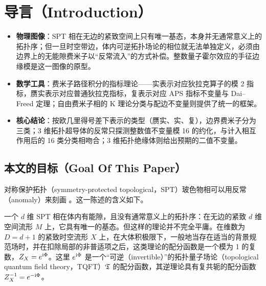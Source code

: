 
\section{导言（Introduction）}\label{intro}

\begin{keytakeaways}
\begin{itemize}[leftmargin=1.6em,itemsep=0.2em,topsep=0.2em]
  \item \textbf{物理图像}：SPT 相在无边的紧致空间上只有唯一基态，本身并无通常意义上的拓扑序；但一旦时空带边，体内可逆拓扑场论的相位就无法单独定义，必须由边界上的无能隙费米子以“反常流入”的方式补偿。整数量子霍尔效应的手征边缘模是这一图像的原型。
  \item \textbf{数学工具}：费米子路径积分的指标理论------实表示对应狄拉克算子的模 2 指标，赝实表示对应普通狄拉克指标，复表示对应 APS 指标不变量与 Dai--Freed 定理；自由费米子相的 K 理论分类与配边不变量则提供了统一的框架。
  \item \textbf{核心结论}：按欧几里得号差下表示的类型（赝实、实、复），边界费米子分为三类；3 维拓扑超导体的反常只探测整数值不变量模 16 的约化，与计入相互作用后的 16 类分类相吻合；3 维拓扑绝缘体则给出预期的二值不变量。
\end{itemize}
\end{keytakeaways}

\subsection{本文的目标（Goal Of This Paper）}\label{goal}

对称保护拓扑（symmetry-protected topological，SPT）玻色物相可以用反常（anomaly）来刻画 \cite{WenEtAl}。这一陈述的含义如下。

一个 $d$ 维 SPT 相在体内有能隙，且没有通常意义上的拓扑序：在无边的紧致 $d$ 维空间流形 $M$ 上，它具有唯一的基态。但这样的理论并不完全平庸。在维数为 $D=d+1$ 的紧致时空流形 $X$ 上，在大体积极限下，一般地当存在适当的背景规范场时，并在扣除局部的非普适项之后，这类理论的配分函数是一个模为 1 的复数，$Z_X=e^{{\mathrm i}\Phi}$。这里 $e^{{\mathrm i}\Phi}$ 是一个“可逆（invertible）”的拓扑量子场论（topological quantum field theory，TQFT）${\mathfrak T}$ 的配分函数，其逆理论具有复共轭的配分函数 $Z_X^{-1}=e^{-{\mathrm i}\Phi}$。

